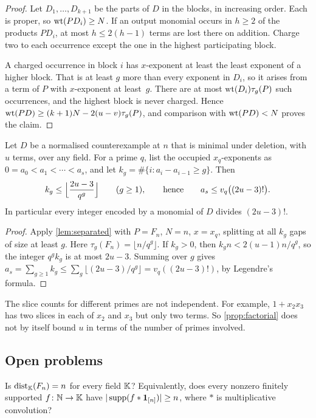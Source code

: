 \begin{proof}
Let $D_1,\dots,D_{k+1}$ be the parts of $D$ in the blocks, in increasing order. Each is proper, so $\operatorname{wt}(PD_i)\ge N$. If an output monomial occurs in $h\ge2$ of the products $PD_i$, at most $h\le2(h-1)$ terms are lost there on addition. Charge two to each occurrence except the one in the highest participating block.

A charged occurrence in block $i$ has $x$-exponent at least the least exponent of a higher block. That is at least $g$ more than every exponent in $D_i$, so it arises from a term of $P$ with $x$-exponent at least~$g$. There are at most $\operatorname{wt}(D_i)\tau_g(P)$ such occurrences, and the highest block is never charged. Hence $\operatorname{wt}(PD)\ge(k+1)N-2(u-v)\tau_g(P)$, and comparison with $\operatorname{wt}(PD)<N$ proves the claim.
\end{proof}

\begin{proposition}\label{prop:factorial}
Let $D$ be a normalised counterexample at $n$ that is minimal under deletion, with $u$ terms, over any field. For a prime $q$, list the occupied $x_q$-exponents as $0=a_0<a_1<\cdots<a_s$, and let $k_g=\#\{i:a_i-a_{i-1}\ge g\}$. Then
\[
 k_g\le\Bigl\lfloor\frac{2u-3}{q^g}\Bigr\rfloor\qquad(g\ge1),
 \qquad\text{hence}\qquad a_s\le v_q\bigl((2u-3)!\bigr).
\]
In particular every integer encoded by a monomial of $D$ divides $(2u-3)!$.
\end{proposition}

\begin{proof}
Apply \cref{lem:separated} with $P=F_n$, $N=n$, $x=x_q$, splitting at all $k_g$ gaps of size at least $g$. Here $\tau_g(F_n)=\lfloor n/q^g\rfloor$. If $k_g>0$, then $k_gn<2(u-1)n/q^g$, so the integer $q^gk_g$ is at most $2u-3$. Summing over $g$ gives $a_s=\sum_{g\ge1}k_g\le\sum_g\lfloor(2u-3)/q^g\rfloor=v_q((2u-3)!)$, by Legendre's formula.
\end{proof}

The slice counts for different primes are not independent. For example, $1+x_2x_3$ has two slices in each of $x_2$ and $x_3$ but only two terms. So \cref{prop:factorial} does not by itself bound $u$ in terms of the number of primes involved.

\subsection{Open problems}
\begin{question}\label{q:odd}
Is $\operatorname{dist}_{\mathbb{K}}(F_n)=n$ for every field $\mathbb{K}$? Equivalently, does every nonzero finitely supported $f\colon\mathbb{N}\to\mathbb{K}$ have $|\operatorname{supp}(f*\mathbf 1_{[n]})|\ge n$, where $*$ is multiplicative convolution?
\end{question}

